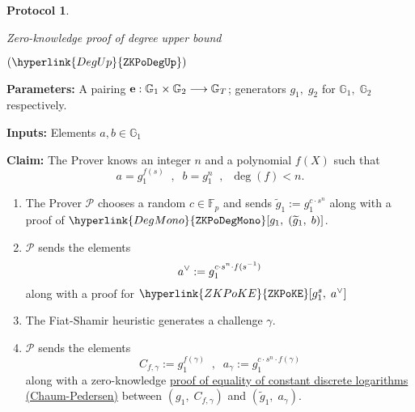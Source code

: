\documentclass[11pt, lettersize, notitlepage, leqno, footskip=0.6cm]{article}
\newcommand{\bFp}{\mathbb{F}_p}
\newcommand{\lra}{\longrightarrow}
\newcommand{\wti}{\widetilde}
\newcommand{\mc}{\mathcal}
\newcommand{\mb}{\mathbb}
\newcommand{\mbf}{\mathbf}
\newcommand{\mP}{\mc{P}}
\newcommand{\V}{\mc{V}}
\newcommand{\vs}{\vspace{-0.15cm}}
\newcommand{\sta}{\stackrel{?}{=}}
\newcommand{\e}{\mbf{e}}
\newtheorem{Prot}[Thm]{Protocol}
\numberwithin{equation}{section}
\begin{document}
\begin{comment}

\item $\V$ verifies the $\hyperlink{ZKPoKE}{\tt{ZKPoKE}}$s, the $\hyperlink{Const}{\tt{ZKPoConst}}$ and the (batchable) equations \vs $$\e(\wti{b}_1,g_2) \sta  \e(b_1  ,\wti{g}_2)\;\;,\;\;\e(\wti{g}_1,g_2)\sta \e(g_1,\wti{g}_2). \vs $$  \qed \end{enumerate} \end{mdframed}

\end{comment}



\bigskip




\begin{mdframed}
\begin{Prot} \hypertarget{DegUp}{Zero-knowledge proof of degree upper bound} $(\hyperlink{DegUp}{\tt{ZKPoDegUp}})$\end{Prot}  

\noindent \textbf{Parameters:} A pairing ${\bf{e}}:\mb{G}_1\times \mb{G}_2\lra \mb{G}_T$; generators $g_1,\;g_2$ for $\mb{G}_1,\; \mb{G}_2$ respectively.


\noindent \textbf{Inputs:} Elements $a, b\in \mb{G}_1$

\noindent \textbf{Claim:} The Prover knows an integer $n$ and a polynomial $f(X)$  such that \vs $$a = g_1^{f(s)}\;\;,\;\; b = g_1^n \;\;,\;\; \deg(f) < n  .$$ 

\begin{enumerate}[wide, labelwidth=!, labelindent=0pt, itemsep=-0.2ex]

\item The Prover $\mP$ chooses a random $c\in \bFp$ and sends $\wti{g}_1:= g_1^{c\cdot s^n}$ along with a proof of $\hyperlink{DegMono}{\tt{ZKPoDegMono}}[g_1,\;(\wti{g}_1,\;b)]$.

\item $\mP$ sends the elements \vs $$a^{\vee}:= g_1^{c\cdot s^n\cdot f(s^{-1})}\vs $$ along with a proof for $\hyperlink{ZKPoKE}{\tt{ZKPoKE}}[g_1^s,\;a^{\vee}]$ 

\item The Fiat-Shamir heuristic generates a challenge $\gamma$.

\item $\mP$ sends the elements $$C_{f,\gamma}:= g_1^{f(\gamma)}\;\;,\;\; a_{\gamma}:= g_1^{c\cdot s^n\cdot f(\gamma)}   $$ along with a zero-knowledge \hyperlink{CP}{proof of equality of constant discrete logarithms (Chaum-Pedersen)} between $(g_1,\;C_{f,\gamma})$ and $(\wti{g}_1,\; a_{\gamma})$.


\end{enumerate}
\end{mdframed}
\end{document}
